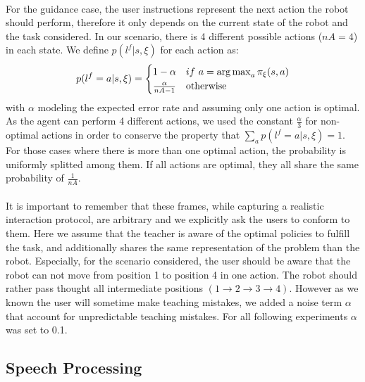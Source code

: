 \paragraph{} For the guidance case, the user instructions represent the next action the robot should perform, therefore it only depends on the current state of the robot and the task considered. In our scenario, there is 4 different possible actions ($nA = 4$) in each state. We define $p(l^f |s, \xi)$ for each action as:
%
\begin{equation}
    p(l^f = a |s,\xi) = 
    \begin{cases}
        1-\alpha & if~a = \argmax_a \pi_{\xi}(s,a)\\
        \frac{\alpha}{nA-1} & \text{otherwise}\\
   \end{cases}
   \label{eq:guidanceframe}
\end{equation}
%
with $\alpha$ modeling the expected error rate and assuming only one action is optimal. As the agent can perform 4 different actions, we used the constant $\frac{\alpha}{3}$ for non-optimal actions in order to conserve the property that $\sum_a p(l^f = a |s,\xi) = 1$. For those cases where there is more than one optimal action, the probability is uniformly splitted among them. If all actions are optimal, they all share the same probability of $\frac{1}{nA}$.

\paragraph{} It is important to remember that these frames, while capturing a realistic interaction protocol, are arbitrary and we explicitly ask the users to conform to them. Here we assume that the teacher is aware of the optimal policies to fulfill the task, and additionally shares the same representation of the problem than the robot. Especially, for the scenario considered, the user should be aware that the robot can not move from position 1 to position 4 in one action. The robot should rather pass thought all intermediate positions $(1 \rightarrow 2 \rightarrow 3 \rightarrow 4)$. However as we known the user will sometime make teaching mistakes, we added a noise term $\alpha$ that account for unpredictable teaching mistakes. For all following experiments $\alpha$ was set to 0.1.

\subsection{Speech Processing}
\label{chapter:lfui:speechdata}

